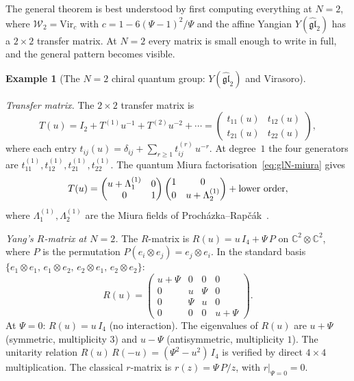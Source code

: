 \documentclass[11pt,reqno]{amsart}
\theoremstyle{definition}
\newtheorem{example}[theorem]{Example}
\theoremstyle{remark}
\newcommand{\cW}{\mathcal{W}}
\newcommand{\CC}{\mathbb{C}}
\numberwithin{equation}{section}
\begin{document}
The general theorem is best understood by first computing
everything at $N = 2$, where $\cW_2 = \mathrm{Vir}_c$ with
$c = 1 - 6(\Psi - 1)^2/\Psi$ and the affine Yangian
$Y(\widehat{\mathfrak{gl}}_2)$ has a $2 \times 2$ transfer
matrix. At $N = 2$ every matrix is small enough to write
in full, and the general pattern becomes visible.

\begin{example}[The $N = 2$ chiral quantum group:
$Y(\widehat{\mathfrak{gl}}_2)$ and Virasoro]
\label{ex:gl2-chiral-qg}

\emph{Transfer matrix.}
The $2 \times 2$ transfer matrix is
\begin{equation}\label{eq:gl2-transfer}
  T(u) = I_2 + T^{(1)} u^{-1} + T^{(2)} u^{-2} + \cdots
  = \begin{pmatrix}
    t_{11}(u) & t_{12}(u) \\
    t_{21}(u) & t_{22}(u)
  \end{pmatrix},
\end{equation}
where each entry $t_{ij}(u) = \delta_{ij}
+ \sum_{r \geq 1} t_{ij}^{(r)}\, u^{-r}$.
At degree~$1$ the four generators are
$t_{11}^{(1)}, t_{12}^{(1)}, t_{21}^{(1)}, t_{22}^{(1)}$.
The quantum Miura factorisation~\eqref{eq:glN-miura}
gives
\[
  T(u) = \begin{pmatrix} u + \Lambda_1^{(1)} & 0 \\
  0 & 1 \end{pmatrix}
  \begin{pmatrix} 1 & 0 \\
  0 & u + \Lambda_2^{(1)} \end{pmatrix}
  + \textup{lower order},
\]
where $\Lambda_1^{(1)}, \Lambda_2^{(1)}$ are the Miura
fields of Proch\'azka--Rap\v{c}\'ak~\cite{PR19}.

\medskip
\emph{Yang's $R$-matrix at $N = 2$.}
The $R$-matrix is $R(u) = u\, I_4 + \Psi\, P$ on
$\CC^2 \otimes \CC^2$, where $P$ is the permutation
$P(e_i \otimes e_j) = e_j \otimes e_i$.
In the standard basis
$\{e_1 \otimes e_1,\, e_1 \otimes e_2,\,
e_2 \otimes e_1,\, e_2 \otimes e_2\}$:
\begin{equation}\label{eq:gl2-R-explicit}
  R(u) =
  \begin{pmatrix}
    u + \Psi & 0 & 0 & 0 \\
    0 & u & \Psi & 0 \\
    0 & \Psi & u & 0 \\
    0 & 0 & 0 & u + \Psi
  \end{pmatrix}.
\end{equation}
At $\Psi = 0$: $R(u) = u\, I_4$ (no interaction). The
eigenvalues of $R(u)$ are $u + \Psi$ (symmetric, multiplicity
$3$) and $u - \Psi$ (antisymmetric, multiplicity $1$). The
unitarity relation $R(u)\, R(-u) = (\Psi^2 - u^2)\, I_4$
is verified by direct $4 \times 4$ multiplication.
The classical $r$-matrix is
$r(z) = \Psi\, P/z$, with $r|_{\Psi = 0} = 0$.


\end{example}
\end{document}
